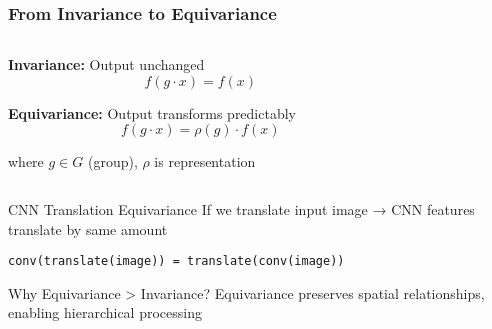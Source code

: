 \begin{frame}[fragile]\frametitle{From Invariance to Equivariance}

\begin{columns}
\begin{column}{0.5\textwidth}
\textbf{Invariance:} Output unchanged
$$f(g \cdot x) = f(x)$$

\textbf{Equivariance:} Output transforms predictably  
$$f(g \cdot x) = \rho(g) \cdot f(x)$$

where $g \in G$ (group), $\rho$ is representation
\end{column}
\begin{column}{0.5\textwidth}
\end{column}
\end{columns}

\vspace{0.5cm}

\begin{exampleblock}{CNN Translation Equivariance}
If we translate input image → CNN features translate by same amount

\texttt{conv(translate(image)) = translate(conv(image))}
\end{exampleblock}

\begin{alertblock}{Why Equivariance > Invariance?}
Equivariance preserves spatial relationships, enabling hierarchical processing
\end{alertblock}

\end{frame}

